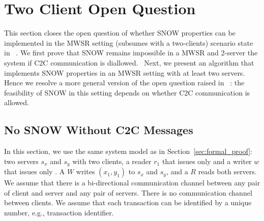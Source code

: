 \section{Two Client Open Question}
\label{sec:2c2s}
{ \color{blue}
This section closes the open question of whether SNOW properties can be implemented in the MWSR setting (subsumes with a two-clients) scenario state in ~\cite{SNOW2016}. We first prove that SNOW remains impossible in a 
MWSR and 2-server the system if C2C communication is diallowed. 
Next, we present an algorithm that implements SNOW properties in an MWSR setting with at least two servers. Hence we resolve a more general version of the open question raised in ~\cite{SNOW2016}: the feasibility of SNOW in this setting depends on whether C2C communication is allowed.
}
 
 \subsection{No  SNOW Without C2C  Messages}
 \label{subsec:no_snow_no_c2c}
 In this section, we use the same system model as in Section~\ref{sec:formal_proof}: two servers $s_x$ and $s_y$ with two clients, a reader $r_1$ that issues only 
\rots{} and a writer $w$ that issues only \wots{}. A \wot{} $W$ writes $(x_1, y_1)$ to $s_x$ and $s_y$, and a \rot{} $R$ reads both servers. We assume that there is a bi-directional communication channel between any pair of client and server and any pair of servers. There is no communication channel between clients. We assume that each transaction can be identified by a unique number, e.g., transaction identifier. 

